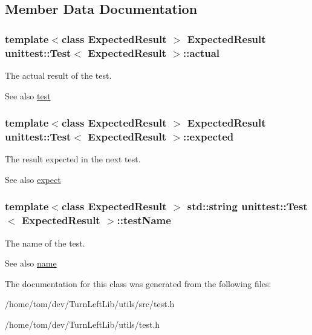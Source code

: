 \subsection{Member Data Documentation}
\hypertarget{classunittest_1_1Test_a94ffef90be10c89de6905724d007065e}{
\subsubsection[{actual}]{\setlength{\rightskip}{0pt plus 5cm}template$<$class ExpectedResult $>$ ExpectedResult {\bf unittest::Test}$<$ ExpectedResult $>$::{\bf actual}}}
\label{classunittest_1_1Test_a94ffef90be10c89de6905724d007065e}
The actual result of the test. \begin{DoxySeeAlso}{See also}
\hyperlink{classunittest_1_1Test_a68e6b4f7a18747533b9000640a8e0abb}{test} 
\end{DoxySeeAlso}
\hypertarget{classunittest_1_1Test_a4c5c14e9919c00b53f973cac370455b0}{
\subsubsection[{expected}]{\setlength{\rightskip}{0pt plus 5cm}template$<$class ExpectedResult $>$ ExpectedResult {\bf unittest::Test}$<$ ExpectedResult $>$::{\bf expected}}}
\label{classunittest_1_1Test_a4c5c14e9919c00b53f973cac370455b0}
The result expected in the next test. \begin{DoxySeeAlso}{See also}
\hyperlink{classunittest_1_1Test_a3d050190dab1a5a3180ba683814feaf5}{expect} 
\end{DoxySeeAlso}
\hypertarget{classunittest_1_1Test_a864ad88ceccb86bbf71b33582495dfac}{
\subsubsection[{testName}]{\setlength{\rightskip}{0pt plus 5cm}template$<$class ExpectedResult $>$ std::string {\bf unittest::Test}$<$ ExpectedResult $>$::{\bf testName}}}
\label{classunittest_1_1Test_a864ad88ceccb86bbf71b33582495dfac}
The name of the test. \begin{DoxySeeAlso}{See also}
\hyperlink{classunittest_1_1Test_abffe1fce54d311766a4c177f6b0fa9cd}{name} 
\end{DoxySeeAlso}


The documentation for this class was generated from the following files:\begin{DoxyCompactItemize}
\item 
/home/tom/dev/TurnLeftLib/utils/src/test.h\item 
/home/tom/dev/TurnLeftLib/utils/test.h\end{DoxyCompactItemize}
